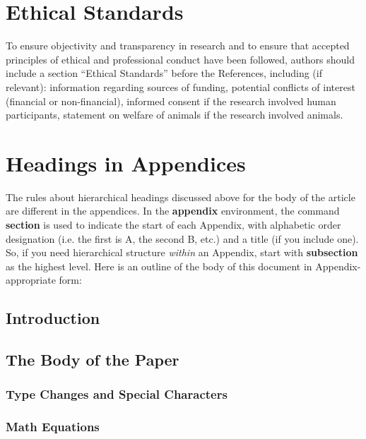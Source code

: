 \documentclass{nime-alternate} %
\begin{document}
\section{Ethical Standards}
To ensure objectivity and transparency in research and to ensure that accepted principles of ethical and professional conduct have been followed, authors should include a section “Ethical Standards” before the References, including (if relevant): information regarding sources of funding, potential conflicts of interest (financial or non-financial), informed consent if the research involved human participants, statement on welfare of animals if the research involved animals.


%


	 


%
%
\appendix
\section{Headings in Appendices}
The rules about hierarchical headings discussed above for
the body of the article are different in the appendices.
In the \textbf{appendix} environment, the command
\textbf{section} is used to
indicate the start of each Appendix, with alphabetic order
designation (i.e. the first is A, the second B, etc.) and
a title (if you include one).  So, if you need
hierarchical structure
\textit{within} an Appendix, start with \textbf{subsection} as the
highest level. Here is an outline of the body of this
document in Appendix-appropriate form:
\subsection{Introduction}
\subsection{The Body of the Paper}
\subsubsection{Type Changes and  Special Characters}
\subsubsection{Math Equations}
\end{document}
